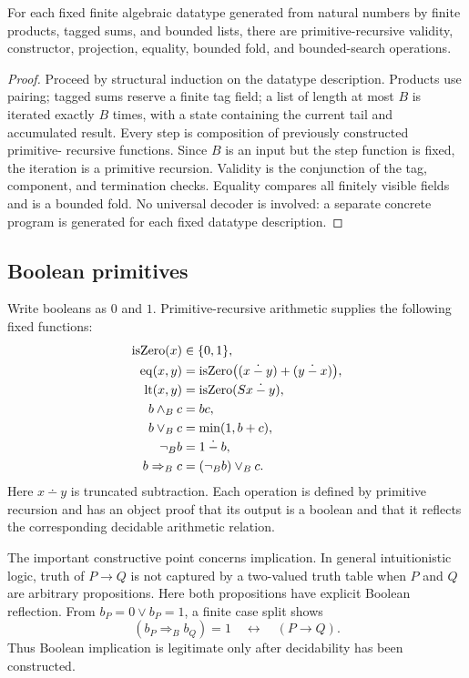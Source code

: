 \begin{lemma}
For each fixed finite algebraic datatype generated from natural numbers by finite products, tagged sums,
and bounded lists, there are primitive-recursive validity, constructor, projection, equality, bounded fold,
and bounded-search operations.
\end{lemma}
\begin{proof}
Proceed by structural induction on the datatype description.  Products use pairing; tagged sums reserve a
finite tag field; a list of length at most \(B\) is iterated exactly \(B\) times, with a state containing the
current tail and accumulated result.  Every step is composition of previously constructed primitive-
recursive functions.  Since \(B\) is an input but the step function is fixed, the iteration is a primitive
recursion.  Validity is the conjunction of the tag, component, and termination checks.  Equality compares
all finitely visible fields and is a bounded fold.  No universal decoder is involved: a separate concrete
program is generated for each fixed datatype description.
\end{proof}

\subsection{Boolean primitives}

Write booleans as \(0\) and \(1\).  Primitive-recursive arithmetic supplies the following fixed functions:
\begin{align*}
  \operatorname{isZero}(x) &\in\{0,1\},\\
  \operatorname{eq}(x,y) &=
    \operatorname{isZero}\bigl((x\mathbin{\dot{-}} y)+(y\mathbin{\dot{-}} x)\bigr),\\
  \operatorname{lt}(x,y) &= \operatorname{isZero}(Sx\mathbin{\dot{-}} y),\\
  b\wedge_B c &= bc,\\
  b\vee_B c &= \min(1,b+c),\\
  \neg_B b &= 1\mathbin{\dot{-}} b,\\
  b\Rightarrow_B c &= (\neg_B b)\vee_B c.
\end{align*}
Here \(x\dotminus y\) is truncated subtraction.  Each operation is defined by primitive recursion and has
an object proof that its output is a boolean and that it reflects the corresponding decidable arithmetic
relation.

The important constructive point concerns implication.  In general intuitionistic logic, truth of
\(P\to Q\) is not captured by a two-valued truth table when \(P\) and \(Q\) are arbitrary propositions.
Here both propositions have explicit Boolean reflection.  From \(b_P=0\vee b_P=1\), a finite case split
shows
\[
  (b_P\Rightarrow_B b_Q)=1
  \quad\longleftrightarrow\quad
  (P\to Q).
\]
Thus Boolean implication is legitimate only after decidability has been constructed.

